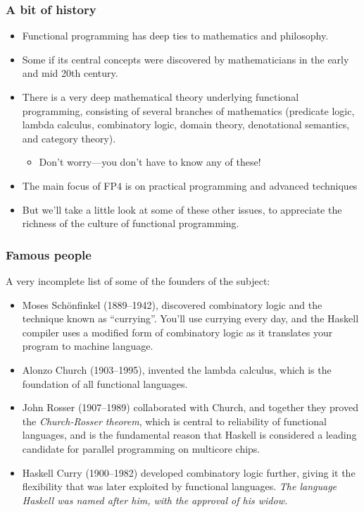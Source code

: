 \documentclass{beamer}
\begin{document}
\begin{frame}
\frametitle{A bit of history}

\begin{itemize}
\item Functional programming has deep ties to mathematics and
  philosophy.
\item Some if its central concepts were discovered by
  mathematicians in the early and mid 20th century.
\item There is a very deep mathematical theory underlying
  functional programming, consisting of several branches of
  mathematics (predicate logic, lambda calculus, combinatory logic,
  domain theory, denotational semantics, and category theory).
  \begin{itemize}
  \item Don't worry---you don't have to know any of these!
  \end{itemize}
\item The main focus of FP4 is on practical programming and
  advanced techniques
\item But we'll take a little look at some of these other issues,
  to appreciate the richness of the culture of functional
  programming.
\end{itemize}

\end{frame}

\begin{frame}
\frametitle{Famous people}

A very incomplete list of some of the founders of the subject: 

\begin{itemize}
\item Moses Sch\"onfinkel (1889--1942), discovered combinatory
  logic and the technique known as ``currying''.  You'll use
  currying every day, and the Haskell compiler uses a modified form
  of combinatory logic as it translates your program to machine
  language.
\item Alonzo Church (1903--1995), invented the lambda calculus,
  which is the foundation of all functional languages.
\item John Rosser (1907--1989) collaborated with Church, and
  together they proved the \emph{Church-Rosser theorem}, which is
  central to reliability of functional languages, and is the
  fundamental reason that Haskell is considered a leading candidate
  for parallel programming on multicore chips.
\item Haskell Curry (1900--1982) developed combinatory logic
  further, giving it the flexibility that was later exploited by
  functional languages.  \emph{The language Haskell was named after
    him, with the approval of his widow.}
\end{itemize}

\end{frame}
\end{document}
